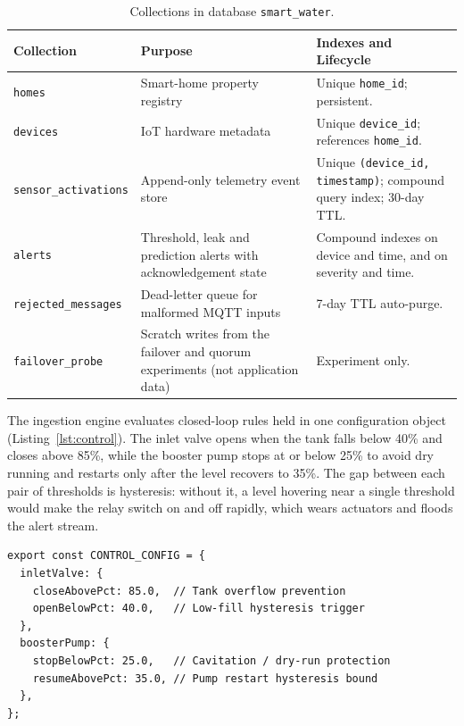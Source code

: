 \documentclass[11pt,a4paper]{article}
\begin{document}
\begin{table}[htbp]
\centering\small
\caption{Collections in database \texttt{smart\_water}.}\label{tab:collections}
\renewcommand{\arraystretch}{1.3}
\begin{tabularx}{\textwidth}{|l|Y|Y|}
\hline
\textbf{Collection} & \textbf{Purpose} & \textbf{Indexes and Lifecycle}\\
\hline
\texttt{homes} & Smart-home property registry & Unique \texttt{home\_id}; persistent.\\
\hline
\texttt{devices} & IoT hardware metadata & Unique \texttt{device\_id}; references \texttt{home\_id}.\\
\hline
\texttt{sensor\_activations} & Append-only telemetry event store & Unique \texttt{(device\_id, timestamp)}; compound query index; 30-day TTL.\\
\hline
\texttt{alerts} & Threshold, leak and prediction alerts with acknowledgement state & Compound indexes on device and time, and on severity and time.\\
\hline
\texttt{rejected\_messages} & Dead-letter queue for malformed MQTT inputs & 7-day TTL auto-purge.\\
\hline
\texttt{failover\_probe} & Scratch writes from the failover and quorum experiments (not application data) & Experiment only.\\
\hline
\end{tabularx}
\end{table}

The ingestion engine evaluates closed-loop rules held in one configuration object (Listing~\ref{lst:control}). The inlet valve opens when the tank falls below 40\% and closes above 85\%, while the booster pump stops at or below 25\% to avoid dry running and restarts only after the level recovers to 35\%. The gap between each pair of thresholds is hysteresis: without it, a level hovering near a single threshold would make the relay switch on and off rapidly, which wears actuators and floods the alert stream.

\begin{lstlisting}[float=tbp,caption={Hysteresis thresholds for inlet valve and booster pump (src/lib/devices.js).},label={lst:control}]
export const CONTROL_CONFIG = {
  inletValve: {
    closeAbovePct: 85.0,  // Tank overflow prevention
    openBelowPct: 40.0,   // Low-fill hysteresis trigger
  },
  boosterPump: {
    stopBelowPct: 25.0,   // Cavitation / dry-run protection
    resumeAbovePct: 35.0, // Pump restart hysteresis bound
  },
};
\end{lstlisting}
\end{document}
